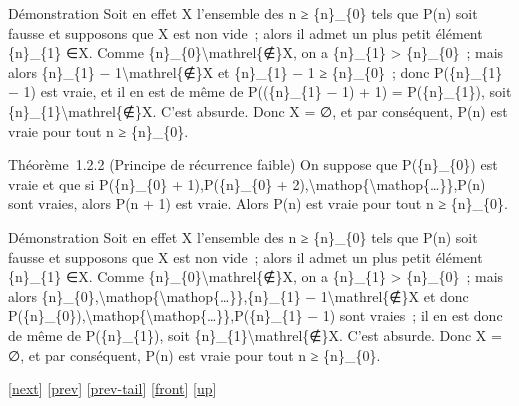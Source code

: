 \documentclass[]{article}
\begin{document}
Démonstration Soit en effet X l'ensemble des n ≥ \{n\}\_\{0\} tels que
P(n) soit fausse et supposons que X est non vide~; alors il admet un
plus petit élément \{n\}\_\{1\} ∈X. Comme
\{n\}\_\{0\}\textbackslash{}mathrel\{∉\}X, on a \{n\}\_\{1\}
\textgreater{} \{n\}\_\{0\}~; mais alors \{n\}\_\{1\} −
1\textbackslash{}mathrel\{∉\}X et \{n\}\_\{1\} − 1 ≥ \{n\}\_\{0\}~; donc
P(\{n\}\_\{1\} − 1) est vraie, et il en est de même de P((\{n\}\_\{1\} −
1) + 1) = P(\{n\}\_\{1\}), soit
\{n\}\_\{1\}\textbackslash{}mathrel\{∉\}X. C'est absurde. Donc X = ∅, et
par conséquent, P(n) est vraie pour tout n ≥ \{n\}\_\{0\}.

Théorème~1.2.2 (Principe de récurrence faible) On suppose que
P(\{n\}\_\{0\}) est vraie et que si P(\{n\}\_\{0\} + 1),P(\{n\}\_\{0\} +
2),\textbackslash{}mathop\{\textbackslash{}mathop\{\ldots{}\}\},P(n)
sont vraies, alors P(n + 1) est vraie. Alors P(n) est vraie pour tout n
≥ \{n\}\_\{0\}.

Démonstration Soit en effet X l'ensemble des n ≥ \{n\}\_\{0\} tels que
P(n) soit fausse et supposons que X est non vide~; alors il admet un
plus petit élément \{n\}\_\{1\} ∈X. Comme
\{n\}\_\{0\}\textbackslash{}mathrel\{∉\}X, on a \{n\}\_\{1\}
\textgreater{} \{n\}\_\{0\}~; mais alors
\{n\}\_\{0\},\textbackslash{}mathop\{\textbackslash{}mathop\{\ldots{}\}\},\{n\}\_\{1\}
− 1\textbackslash{}mathrel\{∉\}X et donc
P(\{n\}\_\{0\}),\textbackslash{}mathop\{\textbackslash{}mathop\{\ldots{}\}\},P(\{n\}\_\{1\}
− 1) sont vraies~; il en est donc de même de P(\{n\}\_\{1\}), soit
\{n\}\_\{1\}\textbackslash{}mathrel\{∉\}X. C'est absurde. Donc X = ∅, et
par conséquent, P(n) est vraie pour tout n ≥ \{n\}\_\{0\}.

{[}\href{coursse3.html}{next}{]} {[}\href{coursse1.html}{prev}{]}
{[}\href{coursse1.html\#tailcoursse1.html}{prev-tail}{]}
{[}\href{coursse2.html}{front}{]}
{[}\href{coursch2.html\#coursse2.html}{up}{]}
\end{document}

